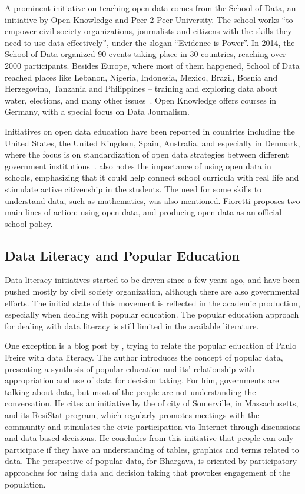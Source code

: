 A prominent initiative on teaching open data comes from the School of Data, an initiative by Open Knowledge and Peer 2 Peer University. 
The school works “to empower civil society organizations, journalists and citizens with the skills they need to use data effectively”, under the slogan “Evidence is Power”.
In 2014, the School of Data organized 90 events taking place in 30 countries, reaching over 2000 participants. Besides Europe, where most of them happened, School of Data reached places like Lebanon, Nigeria, Indonesia, Mexico, Brazil, Bosnia and Herzegovina, Tanzania and Philippines – training and exploring data about water, elections, and many other issues~\cite{SchoolofData2014}. Open Knowledge offers courses in Germany, with a special focus on Data Journalism.

Initiatives on open data education have been reported in countries including the United States, the United Kingdom, Spain, Australia, and especially in Denmark, where the focus is on standardization of open data strategies between different government institutions~\cite{Huijboom2011}.
 also notes the importance of using open data in schools, emphasizing that it could help connect school curricula with real life and stimulate active citizenship in the students. The need for some skills to understand data, such as mathematics, was also mentioned. Fioretti proposes two main lines of action: using open data, and producing open data as an official school policy.

\subsection{Data Literacy and Popular Education}

Data literacy initiatives started to be driven since a few years ago, and have been pushed mostly by civil society organization, although there are also governmental efforts. The initial state of this movement is  reflected in the academic production, especially when dealing with popular education. The popular education approach for dealing with data literacy is still limited in the available literature.

One exception is a blog post by , trying to relate the popular education of Paulo Freire with data literacy. The author introduces the concept of popular data, presenting a synthesis of popular education and its' relationship with appropriation and use of data for decision taking. For him, governments are talking about data, but most of the people are not understanding the conversation. He cites an initiative by the of city of Somerville, in Massachusetts, and its ResiStat program, which regularly promotes meetings with the community and stimulates the civic participation via Internet through discussions and data-based decisions. He concludes from this initiative that people can only participate if they have an understanding of tables, graphics and terms related to data. The perspective of popular data, for Bhargava, is oriented by participatory approaches for using data and decision taking that provokes engagement of the population.

